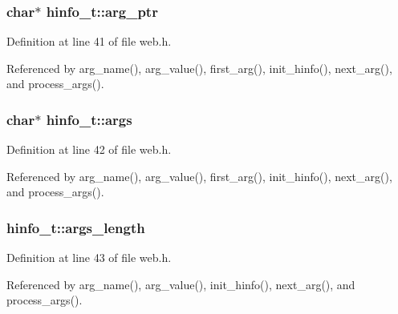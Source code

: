 \subsubsection[{\texorpdfstring{arg\+\_\+ptr}{arg_ptr}}]{\setlength{\rightskip}{0pt plus 5cm}char$\ast$ hinfo\+\_\+t\+::arg\+\_\+ptr}\hypertarget{structhinfo__t_a0d27c1b7d2730373f93342961b9cb18d}{}\label{structhinfo__t_a0d27c1b7d2730373f93342961b9cb18d}


Definition at line 41 of file web.\+h.



Referenced by arg\+\_\+name(), arg\+\_\+value(), first\+\_\+arg(), init\+\_\+hinfo(), next\+\_\+arg(), and process\+\_\+args().

\subsubsection[{\texorpdfstring{args}{args}}]{\setlength{\rightskip}{0pt plus 5cm}char$\ast$ hinfo\+\_\+t\+::args}\hypertarget{structhinfo__t_a62bf198b939a9d932bcac763ebc51443}{}\label{structhinfo__t_a62bf198b939a9d932bcac763ebc51443}


Definition at line 42 of file web.\+h.



Referenced by arg\+\_\+name(), arg\+\_\+value(), first\+\_\+arg(), init\+\_\+hinfo(), next\+\_\+arg(), and process\+\_\+args().

\subsubsection[{\texorpdfstring{args\+\_\+length}{args_length}}]{ hinfo\+\_\+t\+::args\+\_\+length}\hypertarget{structhinfo__t_a003130c9489dfe54a76df23a85fae62f}{}\label{structhinfo__t_a003130c9489dfe54a76df23a85fae62f}


Definition at line 43 of file web.\+h.



Referenced by arg\+\_\+name(), arg\+\_\+value(), init\+\_\+hinfo(), next\+\_\+arg(), and process\+\_\+args().

